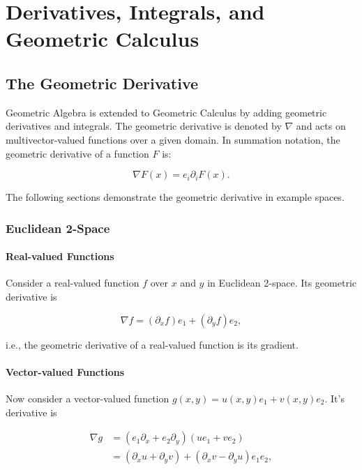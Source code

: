 \chapter{Derivatives, Integrals, and Geometric Calculus}

	\section{The Geometric Derivative}
	
	Geometric Algebra is extended to Geometric Calculus by adding geometric derivatives and integrals. The geometric derivative is denoted by $\nabla$ and acts on multivector-valued functions over a given domain. In summation notation, the geometric derivative of a function $F$ is:
	
	\[
	\nabla F\left( x\right)  = e_i\partial_i F \left( x\right).
	\]
	
	The following sections demonstrate the geometric derivative in example spaces.
	
	\subsection{Euclidean 2-Space}
	
	\subsubsection{Real-valued Functions}
	
	Consider a real-valued function $f$ over $x$ and $y$ in Euclidean 2-space. Its geometric derivative is
	
	\[
	\nabla f = \left( \partial_x f\right) e_1  + \left( \partial_y f\right) e_2,
	\]
	
	i.e., the geometric derivative of a real-valued function is its gradient.
	
	\subsubsection{Vector-valued Functions}
	
	Now consider a vector-valued function $g\left( x, y\right) = u \left( x, y\right)e_1 + v\left( x, y\right)e_2.$ It's derivative is
	
	\begin{align*}
	\nabla g & = \left(e_1\partial_x + e_2\partial_y \right) \left(ue_1 + ve_2 \right) \\
	 & = \left( \partial_x u + \partial_y v\right) + \left( \partial_x v - \partial_y u\right)e_1e_2,  
	\end{align*}
	
